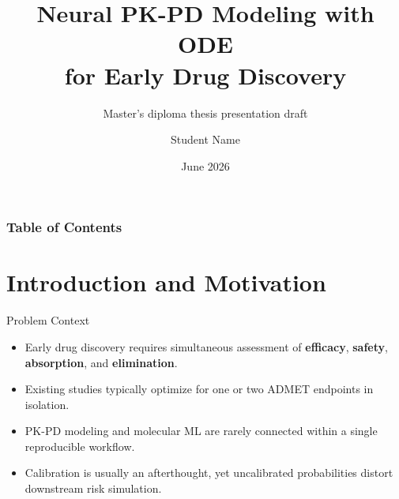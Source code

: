 \documentclass{beamer}
\title[Neural PK-PD Modeling with ODE]{
Neural PK-PD Modeling with ODE\\
for Early Drug Discovery
}
\subtitle{Master's diploma thesis presentation draft}
\author[]{
Student Name
}
\institute[]{
Faculty / Department Name\\
Warsaw University of Technology
}
\date[June 2026]{June 2026}
\begin{document}
\frame{\titlepage}

\begin{frame}
\frametitle{Table of Contents}
\tableofcontents
\end{frame}

\section{Introduction and Motivation}

\begin{frame}{Problem Context}
\begin{itemize}
    \item Early drug discovery requires simultaneous assessment of \textbf{efficacy}, \textbf{safety}, \textbf{absorption}, and \textbf{elimination}.
    \item Existing studies typically optimize for one or two ADMET endpoints in isolation.
    \item PK-PD modeling and molecular ML are rarely connected within a single reproducible workflow.
    \item Calibration is usually an afterthought, yet uncalibrated probabilities distort downstream risk simulation.
\end{itemize}
\end{frame}
\end{document}
